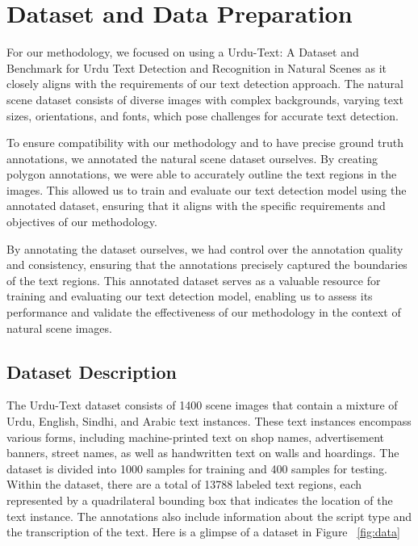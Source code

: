 \setlength{\footskip}{8mm}

\chapter{Dataset and Data Preparation}
\label{ch:Dataset}

For our methodology, we focused on using a \cite{dataset}Urdu-Text: A Dataset and Benchmark for Urdu Text Detection and Recognition in Natural Scenes as it closely aligns with the requirements of our text detection approach. The natural scene dataset consists of diverse images with complex backgrounds, varying text sizes, orientations, and fonts, which pose challenges for accurate text detection.

To ensure compatibility with our methodology and to have precise ground truth annotations, we annotated the natural scene dataset ourselves. By creating polygon annotations, we were able to accurately outline the text regions in the images. This allowed us to train and evaluate our text detection model using the annotated dataset, ensuring that it aligns with the specific requirements and objectives of our methodology.

By annotating the dataset ourselves, we had control over the annotation quality and consistency, ensuring that the annotations precisely captured the boundaries of the text regions. This annotated dataset serves as a valuable resource for training and evaluating our text detection model, enabling us to assess its performance and validate the effectiveness of our methodology in the context of natural scene images.

\section{Dataset Description}
The Urdu-Text dataset consists of 1400 scene images that contain a mixture of Urdu, English, Sindhi, and Arabic text instances. These text instances encompass various forms, including machine-printed text on shop names, advertisement banners, street names, as well as handwritten text on walls and hoardings. The dataset is divided into 1000 samples for training and 400 samples for testing. Within the dataset, there are a total of 13788 labeled text regions, each represented by a quadrilateral bounding box that indicates the location of the text instance. The annotations also include information about the script type and the transcription of the text. Here is a glimpse of a dataset in Figure ~\ref{fig:data}


